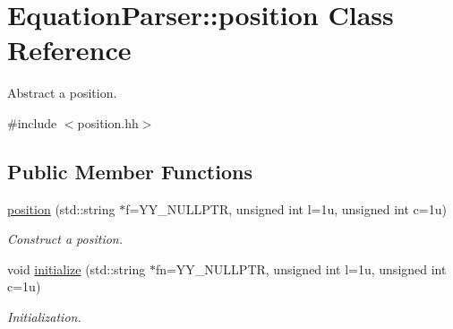 \hypertarget{classEquationParser_1_1position}{}\section{Equation\+Parser\+:\+:position Class Reference}
\label{classEquationParser_1_1position}


Abstract a position.  




{\ttfamily \#include $<$position.\+hh$>$}

\subsection*{Public Member Functions}
\begin{DoxyCompactItemize}
\item 
\hyperlink{classEquationParser_1_1position_abc0115b72ccff74fccd58968c8e6677c}{position} (std\+::string $\ast$f=Y\+Y\+\_\+\+N\+U\+L\+L\+P\+TR, unsigned int l=1u, unsigned int c=1u)\hypertarget{classEquationParser_1_1position_abc0115b72ccff74fccd58968c8e6677c}{}\label{classEquationParser_1_1position_abc0115b72ccff74fccd58968c8e6677c}

\begin{DoxyCompactList}\small\item\em Construct a position. \end{DoxyCompactList}\item 
void \hyperlink{classEquationParser_1_1position_aaf33d1b9eada5c5f4980a44d3d14a1bf}{initialize} (std\+::string $\ast$fn=Y\+Y\+\_\+\+N\+U\+L\+L\+P\+TR, unsigned int l=1u, unsigned int c=1u)\hypertarget{classEquationParser_1_1position_aaf33d1b9eada5c5f4980a44d3d14a1bf}{}\label{classEquationParser_1_1position_aaf33d1b9eada5c5f4980a44d3d14a1bf}

\begin{DoxyCompactList}\small\item\em Initialization. \end{DoxyCompactList}\end{DoxyCompactItemize}
